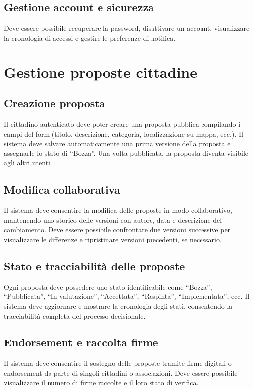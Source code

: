 \subsection{Gestione account e sicurezza}
Deve essere possibile recuperare la password, disattivare un account, visualizzare la cronologia di accessi e gestire le preferenze di notifica.

\section{Gestione proposte cittadine}

\subsection{Creazione proposta}
Il cittadino autenticato deve poter creare una proposta pubblica compilando i campi del form (titolo, descrizione, categoria, localizzazione su mappa, ecc.).  
Il sistema deve salvare automaticamente una prima versione della proposta e assegnarle lo stato di “Bozza”.  
Una volta pubblicata, la proposta diventa visibile agli altri utenti.

\subsection{Modifica collaborativa}
Il sistema deve consentire la modifica delle proposte in modo collaborativo, mantenendo uno storico delle versioni con autore, data e descrizione del cambiamento.  
Deve essere possibile confrontare due versioni successive per visualizzare le differenze e ripristinare versioni precedenti, se necessario.

\subsection{Stato e tracciabilità delle proposte}
Ogni proposta deve possedere uno stato identificabile come “Bozza”, “Pubblicata”, “In valutazione”, “Accettata”, “Respinta”, “Implementata”, ecc.  
Il sistema deve aggiornare e mostrare la cronologia degli stati, consentendo la tracciabilità completa del processo decisionale.

\subsection{Endorsement e raccolta firme}
Il sistema deve consentire il sostegno delle proposte tramite firme digitali o endorsement da parte di singoli cittadini o associazioni.  
Deve essere possibile visualizzare il numero di firme raccolte e il loro stato di verifica.

